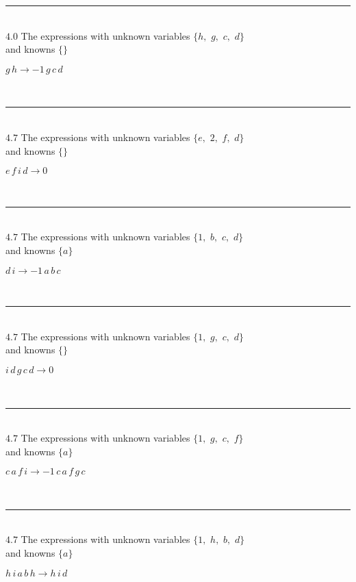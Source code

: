 \documentclass[rep10,leqno]{report}
\begin{document}
\rule[3pt]{6in}{.7pt}\\
$4.0$  The expressions with unknown variables $\{h,
$ $
g,
$ $
c,
$ $
d\}$\\
and knowns $\{\}$\smallskip\\
\begin{minipage}{6in}
$
g\,
 h\rightarrow -1\,
 g\,
 c\,
 d
$
\end{minipage}\\
\rule[3pt]{6in}{.7pt}\\
$4.7$  The expressions with unknown variables $\{e,
$ $
2,
$ $
f,
$ $
d\}$\\
and knowns $\{\}$\smallskip\\
\begin{minipage}{6in}
$
e\,
 f\,
 i\,
 d\rightarrow 0
$
\end{minipage}\\
\rule[3pt]{6in}{.7pt}\\
$4.7$  The expressions with unknown variables $\{1,
$ $
b,
$ $
c,
$ $
d\}$\\
and knowns $\{a\}$\smallskip\\
\begin{minipage}{6in}
$
d\,
 i\rightarrow -1\,
 a\,
 b\,
 c
$
\end{minipage}\\
\rule[3pt]{6in}{.7pt}\\
$4.7$  The expressions with unknown variables $\{1,
$ $
g,
$ $
c,
$ $
d\}$\\
and knowns $\{\}$\smallskip\\
\begin{minipage}{6in}
$
i\,
 d\,
 g\,
 c\,
 d\rightarrow 0
$
\end{minipage}\\
\rule[3pt]{6in}{.7pt}\\
$4.7$  The expressions with unknown variables $\{1,
$ $
g,
$ $
c,
$ $
f\}$\\
and knowns $\{a\}$\smallskip\\
\begin{minipage}{6in}
$
c\,
 a\,
 f\,
 i\rightarrow -1\,
 c\,
 a\,
 f\,
 g\,
 c
$
\end{minipage}\\
\rule[3pt]{6in}{.7pt}\\
$4.7$  The expressions with unknown variables $\{1,
$ $
h,
$ $
b,
$ $
d\}$\\
and knowns $\{a\}$\smallskip\\
\begin{minipage}{6in}
$
h\,
 i\,
 a\,
 b\,
 h\rightarrow h\,
 i\,
 d
$
\end{minipage}\\
\end{document}
